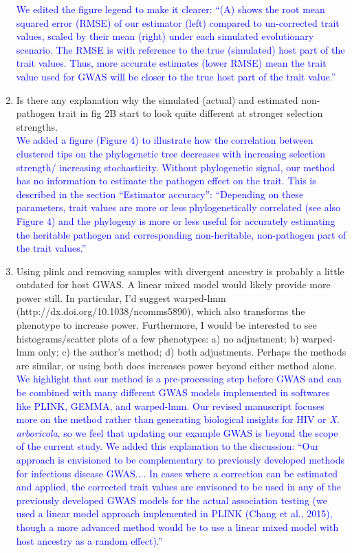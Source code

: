 \documentclass[11pt]{article}
\begin{document}
\begin{enumerate}
    \textcolor{blue}{We edited the figure legend to make it clearer: ``(A) shows the root mean squared error (RMSE) of our estimator (left) compared to un-corrected trait values, scaled by their mean (right) under each simulated evolutionary scenario. The RMSE is with reference to the true (simulated) host part of the trait values. Thus, more accurate estimates (lower RMSE) mean the trait value used for GWAS will be closer to the true host part of the trait value.''}
    \item Is there any explanation why the simulated (actual) and estimated non-pathogen trait in fig 2B start to look quite different at stronger selection strengths. \\
    \textcolor{blue}{We added a figure (Figure 4) to illustrate how the correlation between clustered tips on the phylogenetic tree decreases with increasing selection strength/ increasing stochasticity. Without phylogenetic signal, our method has no information to estimate the pathogen effect on the trait. This is described in the section ``Estimator accuracy'': ``Depending on these parameters, trait values are more or less phylogenetically correlated (see also Figure 4) and the phylogeny is more or less useful for accurately estimating the heritable pathogen and corresponding non-heritable, non-pathogen part of the trait values.''}
    \item Using plink and removing samples with divergent ancestry is probably a little outdated for host GWAS. A linear mixed model would likely provide more power still. In particular, I'd suggest warped-lmm (http://dx.doi.org/10.1038/ncomms5890), which also transforms the phenotype to increase power. Furthermore, I would be interested to see histograms/scatter plots of a few phenotypes: a) no adjustment; b) warped-lmm only; c) the author's method; d) both adjustments. Perhaps the methods are similar, or using both does increases power beyond either method alone. \\
    \textcolor{blue}{We highlight that our method is a pre-processing step before GWAS and can be combined with many different GWAS models implemented in softwares like PLINK, GEMMA, and warped-lmm. Our revised manuscript focuses more on the method rather than generating biological insights for HIV or \emph{X. arboricola}, so we feel that updating our example GWAS is beyond the scope of the current study. We added this explanation to the discussion: ``Our approach is envisioned to be complementary to previously developed methods for infectious disease GWAS.... In cases where a correction can be estimated and applied, the corrected trait values are envisoned to be used in any of the previously developed GWAS models for the actual association testing (we used a linear model approach implemented in PLINK (Chang et al., 2015), though a more advanced method would be to use a linear mixed model with host ancestry as a random effect).''}
\end{enumerate}
\end{document}

